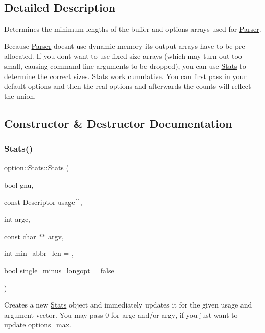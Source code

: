 \subsection{Detailed Description}
Determines the minimum lengths of the buffer and options arrays used for \hyperlink{classoption_1_1Parser}{Parser}. 

Because \hyperlink{classoption_1_1Parser}{Parser} doesn\textquotesingle{}t use dynamic memory its output arrays have to be pre-\/allocated. If you don\textquotesingle{}t want to use fixed size arrays (which may turn out too small, causing command line arguments to be dropped), you can use \hyperlink{structoption_1_1Stats}{Stats} to determine the correct sizes. \hyperlink{structoption_1_1Stats}{Stats} work cumulative. You can first pass in your default options and then the real options and afterwards the counts will reflect the union. 

\subsection{Constructor \& Destructor Documentation}
\mbox{\label{structoption_1_1Stats_a71373ec2b28842f45593e4405f7bc8ec}} 
\subsubsection{\texorpdfstring{Stats()}{Stats()}}
{\footnotesize\ttfamily option\+::\+Stats\+::\+Stats (\begin{DoxyParamCaption}\item[{bool}]{gnu,  }\item[{const \hyperlink{structoption_1_1Descriptor}{Descriptor}}]{usage\mbox{[}$\,$\mbox{]},  }\item[{int}]{argc,  }\item[{const char $\ast$$\ast$}]{argv,  }\item[{int}]{min\+\_\+abbr\+\_\+len = {},  }\item[{bool}]{single\+\_\+minus\+\_\+longopt = {\ttfamily false} }\end{DoxyParamCaption})\hspace{0.3cm}{\ttfamily [inline]}}



Creates a new \hyperlink{structoption_1_1Stats}{Stats} object and immediately updates it for the given {\ttfamily usage} and argument vector. You may pass 0 for {\ttfamily argc} and/or {\ttfamily argv}, if you just want to update \hyperlink{structoption_1_1Stats_a8121787feb1c7db84fca3ccb012b0473}{options\+\_\+max}. 

